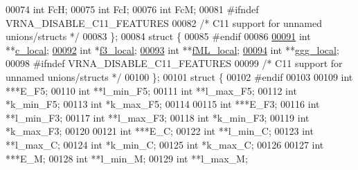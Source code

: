 \begin{DoxyCode}
00074   \textcolor{keywordtype}{int} FcH;
00075   \textcolor{keywordtype}{int} FcI;
00076   \textcolor{keywordtype}{int} FcM;
00081 \textcolor{preprocessor}{#ifndef VRNA\_DISABLE\_C11\_FEATURES}
00082   \textcolor{comment}{/* C11 support for unnamed unions/structs */}
00083 \};
00084 \textcolor{keyword}{struct }\{
00085 \textcolor{preprocessor}{#endif}
00086 
\hyperlink{group__dp__matrices_a116c677ece0832e6ab9cc2fd1ebfe452}{00091}   \textcolor{keywordtype}{int} **\hyperlink{group__dp__matrices_a116c677ece0832e6ab9cc2fd1ebfe452}{c\_local};            
\hyperlink{group__dp__matrices_a6eae0a2b696b0c63bbaa78a70b950600}{00092}   \textcolor{keywordtype}{int} *\hyperlink{group__dp__matrices_a6eae0a2b696b0c63bbaa78a70b950600}{f3\_local};            
\hyperlink{group__dp__matrices_ad37d705240a8e6b1e9a4e4ea19e74003}{00093}   \textcolor{keywordtype}{int} **\hyperlink{group__dp__matrices_ad37d705240a8e6b1e9a4e4ea19e74003}{fML\_local};          
\hyperlink{group__dp__matrices_afd3ea65bc8f06559f7f1ea79072fa385}{00094}   \textcolor{keywordtype}{int} **\hyperlink{group__dp__matrices_afd3ea65bc8f06559f7f1ea79072fa385}{ggg\_local};          
00098 \textcolor{preprocessor}{#ifndef VRNA\_DISABLE\_C11\_FEATURES}
00099   \textcolor{comment}{/* C11 support for unnamed unions/structs */}
00100 \};
00101 \textcolor{keyword}{struct }\{
00102 \textcolor{preprocessor}{#endif}
00103 
00109   \textcolor{keywordtype}{int}           ***E\_F5;
00110   \textcolor{keywordtype}{int}           **l\_min\_F5;
00111   \textcolor{keywordtype}{int}           **l\_max\_F5;
00112   \textcolor{keywordtype}{int}           *k\_min\_F5;
00113   \textcolor{keywordtype}{int}           *k\_max\_F5;
00114 
00115   \textcolor{keywordtype}{int}           ***E\_F3;
00116   \textcolor{keywordtype}{int}           **l\_min\_F3;
00117   \textcolor{keywordtype}{int}           **l\_max\_F3;
00118   \textcolor{keywordtype}{int}           *k\_min\_F3;
00119   \textcolor{keywordtype}{int}           *k\_max\_F3;
00120 
00121   \textcolor{keywordtype}{int}           ***E\_C;
00122   \textcolor{keywordtype}{int}           **l\_min\_C;
00123   \textcolor{keywordtype}{int}           **l\_max\_C;
00124   \textcolor{keywordtype}{int}           *k\_min\_C;
00125   \textcolor{keywordtype}{int}           *k\_max\_C;
00126 
00127   \textcolor{keywordtype}{int}           ***E\_M;
00128   \textcolor{keywordtype}{int}           **l\_min\_M;
00129   \textcolor{keywordtype}{int}           **l\_max\_M;

\end{DoxyCode}
